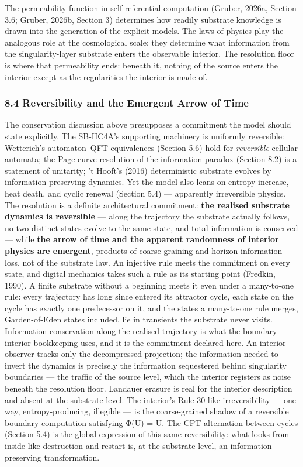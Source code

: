 \documentclass[
]{article}
\begin{document}
The permeability function in self-referential computation (Gruber,
2026a, Section 3.6; Gruber, 2026b, Section 3) determines how readily
substrate knowledge is drawn into the generation of the explicit models.
The laws of physics play the analogous role at the cosmological scale:
they determine what information from the singularity-layer substrate
enters the observable interior. The resolution floor is where that
permeability ends: beneath it, nothing of the source enters the interior
except as the regularities the interior is made of.

\hypertarget{reversibility-and-the-emergent-arrow-of-time}{%
\subsubsection{8.4 Reversibility and the Emergent Arrow of
Time}\label{reversibility-and-the-emergent-arrow-of-time}}

The conservation discussion above presupposes a commitment the model
should state explicitly. The SB-HC4A's supporting machinery is uniformly
reversible: Wetterich's automaton--QFT equivalences (Section 5.6) hold
for \emph{reversible} cellular automata; the Page-curve resolution of
the information paradox (Section 8.2) is a statement of unitarity; 't
Hooft's (2016) deterministic substrate evolves by information-preserving
dynamics. Yet the model also leans on entropy increase, heat death, and
cyclic renewal (Section 5.4) --- apparently irreversible physics. The
resolution is a definite architectural commitment: \textbf{the realised
substrate dynamics is reversible} --- along the trajectory the substrate
actually follows, no two distinct states evolve to the same state, and
total information is conserved --- while \textbf{the arrow of time and
the apparent randomness of interior physics are emergent}, products of
coarse-graining and horizon information-loss, not of the substrate law.
An injective rule meets the commitment on every state, and digital
mechanics takes such a rule as its starting point (Fredkin, 1990). A
finite substrate without a beginning meets it even under a many-to-one
rule: every trajectory has long since entered its attractor cycle, each
state on the cycle has exactly one predecessor on it, and the states a
many-to-one rule merges, Garden-of-Eden states included, lie in
transients the substrate never visits. Information conservation along
the realised trajectory is what the boundary--interior bookkeeping uses,
and it is the commitment declared here. An interior observer tracks only
the decompressed projection; the information needed to invert the
dynamics is precisely the information sequestered behind singularity
boundaries --- the traffic of the source level, which the interior
registers as noise beneath the resolution floor. Landauer erasure is
real for the interior description and absent at the substrate level. The
interior's Rule-30-like irreversibility --- one-way, entropy-producing,
illegible --- is the coarse-grained shadow of a reversible boundary
computation satisfying Φ(U) = U. The CPT alternation between cycles
(Section 5.4) is the global expression of this same reversibility: what
looks from inside like destruction and restart is, at the substrate
level, an information-preserving transformation.
\end{document}
